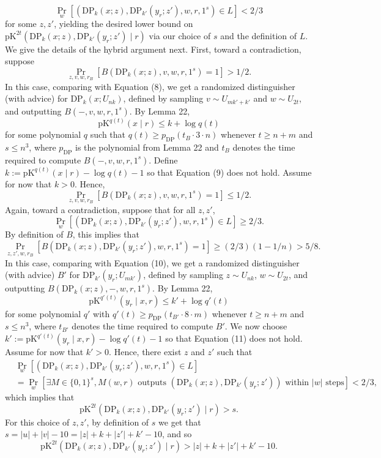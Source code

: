 \documentclass[10pt,a4paper]{article}
\begin{document}
\[\Pr_w[(\mathrm{DP}_k(x;z),\mathrm{DP}_{k'}(y_r;z'),w,r,1^s)\in L]<2/3\]
for some $z,z'$, yielding the desired lower bound on $\mathrm{pK}^{2t}(\mathrm{DP}_k(x;z),\mathrm{DP}_{k'}(y_r;z')\mid r)$ via our choice of $s$ and the definition of $L$. We give the details of the hybrid argument next.
First, toward a contradiction, suppose
\[\Pr_{z,v,w,r_B}[B(\mathrm{DP}_k(x;z),v,w,r,1^s)=1]>1/2.\]
In this case, comparing with Equation (8), we get a randomized distinguisher (with advice) for $\mathrm{DP}_k(x;U_{nk})$, defined by sampling $v\sim U_{mk'+k'}$ and $w\sim U_{2t}$, and outputting $B(-,v,w,r,1^s)$. By Lemma 22,
\[\mathrm{pK}^{q(t)}(x\mid r)\leq k+\log q(t)\tag{9}\]
for some polynomial $q$ such that $q(t)\geq p_{\mathrm{DP}}(t_B\cdot3\cdot n)$ whenever $t\geq n+m$ and $s\leq n^3$, where $p_{\mathrm{DP}}$ is the polynomial from Lemma 22 and $t_B$ denotes the time required to compute $B(-,v,w,r,1^s)$.
Define $k:=\mathrm{pK}^{q(t)}(x\mid r)-\log q(t)-1$ so that Equation (9) does not hold. Assume for now that $k>0$. Hence,
\[\Pr_{z,v,w,r_B}[B(\mathrm{DP}_k(x;z),v,w,r,1^s)=1]\leq1/2.\tag{10}\]
Again, toward a contradiction, suppose that for all $z,z'$,
\[\Pr_w[(\mathrm{DP}_k(x;z),\mathrm{DP}_{k'}(y_r;z'),w,r,1^s)\in L]\geq2/3.\]
By definition of $B$, this implies that
\[\Pr_{z,z',w,r_B}[B(\mathrm{DP}_k(x;z),\mathrm{DP}_{k'}(y_r;z'),w,r,1^s)=1]\geq(2/3)(1-1/n)>5/8.\]
In this case, comparing with Equation (10), we get a randomized distinguisher (with advice) $B'$ for $\mathrm{DP}_{k'}(y_r;U_{mk'})$, defined by sampling $z\sim U_{nk}$, $w\sim U_{2t}$, and outputting $B(\mathrm{DP}_k(x;z),-,w,r,1^s)$. By Lemma 22,
\[\mathrm{pK}^{q'(t)}(y_r\mid x,r)\leq k'+\log q'(t)\tag{11}\]
for some polynomial $q'$ with $q'(t)\geq p_{\mathrm{DP}}(t_{B'}\cdot8\cdot m)$ whenever $t\geq n+m$ and $s\leq n^3$, where $t_{B'}$ denotes the time required to compute $B'$.
We now choose $k':=\mathrm{pK}^{q'(t)}(y_r\mid x,r)-\log q'(t)-1$ so that Equation (11) does not hold. Assume for now that $k'>0$. Hence, there exist $z$ and $z'$ such that
\begin{align*}
&\Pr_w[(\mathrm{DP}_k(x;z),\mathrm{DP}_{k'}(y_r;z'),w,r,1^s)\in L]\\
&=\Pr_w[\exists M\in\{0,1\}^s,M(w,r)\text{ outputs }(\mathrm{DP}_k(x;z),\mathrm{DP}_{k'}(y_r;z'))\text{ within }|w|\text{ steps}]<2/3,
\end{align*}
which implies that
\[\mathrm{pK}^{2t}(\mathrm{DP}_k(x;z),\mathrm{DP}_{k'}(y_r;z')\mid r)>s.\]
For this choice of $z,z'$, by definition of $s$ we get that $s=|u|+|v|-10=|z|+k+|z'|+k'-10$, and so
\[\mathrm{pK}^{2t}(\mathrm{DP}_k(x;z),\mathrm{DP}_{k'}(y_r;z')\mid r)>|z|+k+|z'|+k'-10.\]
\end{document}
